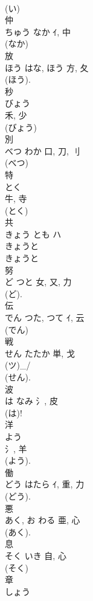 \documentclass[8pt]{extreport}
\begin{document}
\begin{CJK}{UTF8}{min}
\\	(い) 
\\	仲	
\\	ちゅう	なか	ｲ, 中	
\\	(なか) 
\\	放	
\\	ほう	はな, ほう	方, 夂	
\\	(ほう). 
\\	秒	
\\	びょう	
\\	禾, 少	
\\	(びょう) 
\\	別	
\\	べつ	わか	口, 刀, 刂	
\\	(べつ) 
\\	特	
\\	とく	
\\	牛, 寺	
\\	(とく) 
\\	共	
\\	きょう	とも	ハ		
\\	きょうと 
\\	きょうと 
\\	努	
\\	ど	つと	女, 又, 力	
\\	(ど). 
\\	伝	
\\	でん	つた, つて	ｲ, 云	
\\	(でん) 
\\	戦	
\\	せん	たたか	単, 戈	
\\	(ツ)_/
\\	(せん). 
\\	波	
\\	は	なみ	氵, 皮	
\\	(は)!
\\	洋	
\\	よう	
\\	氵, 羊	
\\	(よう). 
\\	働	
\\	どう	はたら	ｲ, 重, 力	
\\	(どう). 
\\	悪	
\\	あく, お	わる	亜, 心	
\\	(あく).	
\\	息	
\\	そく	いき	自, 心	
\\	(そく) 
\\	章	
\\	しょう	

\end{CJK}
\end{document}
